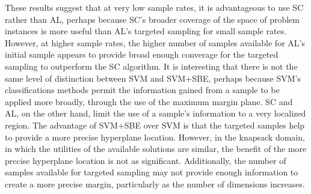 These results suggest that at very low sample rates, it is advantageous to use SC rather than AL, perhaps because SC's broader coverage of the space of problem instances is more useful than AL's targeted sampling for small sample rates.  However, at higher sample rates, the higher number of samples available for AL's initial sample appears to provide broad enough converage for the targeted sampling  to outperform the SC algorithm.  It is interesting that there is not the same level of distinction between SVM and SVM+SBE, perhaps because SVM's classifications methods permit the information gained from a sample to be applied more broadly, through the use of the maximum margin plane.  SC and AL, on the other hand, limit the use of a sample's information to a very localized region.  The advantage of SVM+SBE over SVM is that the targeted samples help to provide a more precise hyperplane location.  However, in the knapsack domain, in which the utilities of the available solutions are similar,  the benefit of the more precise hyperplane location is not as significant.  Additionally, the number of samples available for targeted sampling may not provide enough information to create a more precise margin, particularly as the number of dimensions increases.











